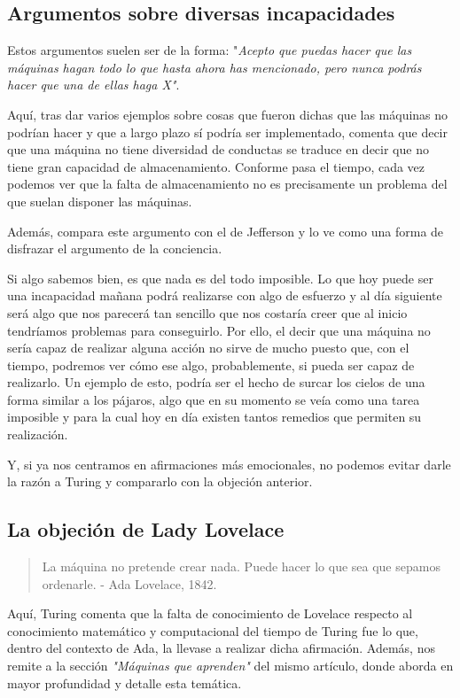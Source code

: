 \documentclass[12pt,a4paper]{article}
\begin{document}
\subsection{Argumentos sobre diversas incapacidades}
Estos argumentos suelen ser de la forma: "\emph{Acepto que puedas hacer que las máquinas hagan todo lo que hasta ahora has mencionado, pero nunca podrás hacer que una de ellas haga X"}.

Aquí, tras dar varios ejemplos sobre cosas que fueron dichas que las máquinas no podrían hacer y que a largo plazo sí podría ser implementado, comenta que decir que una máquina no tiene diversidad de conductas se traduce en decir que no tiene gran capacidad de almacenamiento. Conforme pasa el tiempo, cada vez podemos ver que la falta de almacenamiento no es precisamente un problema del que suelan disponer las máquinas.

Además, compara este argumento con el de Jefferson y lo ve como una forma de disfrazar el argumento de la conciencia.

Si algo sabemos bien, es que nada es del todo imposible. Lo que hoy puede ser una incapacidad mañana podrá realizarse con algo de esfuerzo y al día siguiente será algo que nos parecerá tan sencillo que nos costaría creer que al inicio tendríamos problemas para conseguirlo. Por ello, el decir que una máquina no sería capaz de realizar alguna acción no sirve de mucho puesto que, con el tiempo, podremos ver cómo ese algo, probablemente, si pueda ser capaz de realizarlo. Un ejemplo de esto, podría ser el hecho de surcar los cielos de una forma similar a los pájaros, algo que en su momento se veía como una tarea imposible y para la cual hoy en día existen tantos remedios que permiten su realización.

Y, si ya nos centramos en afirmaciones más emocionales, no podemos evitar darle la razón a Turing y compararlo con la objeción anterior.

\subsection{La objeción de Lady Lovelace}
\begin{quote}\small La máquina no pretende crear nada. Puede hacer lo que sea que sepamos ordenarle. - Ada Lovelace, 1842.\end{quote}

Aquí, Turing comenta que la falta de conocimiento de Lovelace respecto al conocimiento matemático y computacional del tiempo de Turing fue lo que, dentro del contexto de Ada, la llevase a realizar dicha afirmación. Además, nos remite a la sección \emph{"Máquinas que aprenden"} del mismo artículo, donde aborda en mayor profundidad y detalle esta temática.
\end{document}
